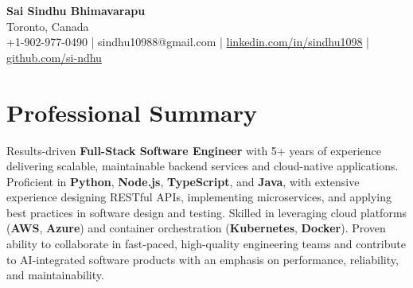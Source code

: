 \documentclass[letterpaper,11pt]{article}
\begin{document}
\begin{center}
  {\Large \textbf{Sai Sindhu Bhimavarapu}} \\
  Toronto, Canada \\
  +1-902-977-0490 \enspace | \enspace sindhu10988@gmail.com \enspace | \enspace \href{https://www.linkedin.com/in/sindhu1098/}{linkedin.com/in/sindhu1098} \enspace | \enspace \href{https://github.com/si-ndhu}{github.com/si-ndhu}
\end{center}

\section{Professional Summary}
  \begin{itemize}[leftmargin=0.15in, label={}]
    \small{\item{
     Results-driven \textbf{Full-Stack Software Engineer} with 5+ years of experience delivering scalable, maintainable backend services and cloud-native applications. Proficient in \textbf{Python}, \textbf{Node.js}, \textbf{TypeScript}, and \textbf{Java}, with extensive experience designing RESTful APIs, implementing microservices, and applying best practices in software design and testing. Skilled in leveraging cloud platforms (\textbf{AWS}, \textbf{Azure}) and container orchestration (\textbf{Kubernetes}, \textbf{Docker}). Proven ability to collaborate in fast-paced, high-quality engineering teams and contribute to AI-integrated software products with an emphasis on performance, reliability, and maintainability.
    }}
  \end{itemize}
\vspace{-16pt}

\end{document}
